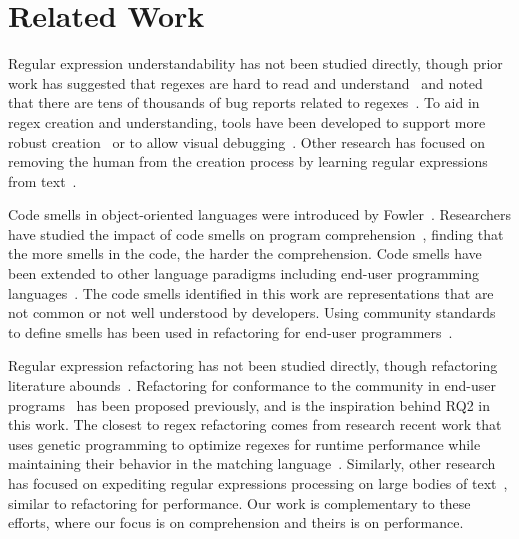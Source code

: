 \section{Related Work}
\label{sec:related}
Regular expression understandability has not been studied directly, though prior work has suggested that regexes are hard to read and understand~\cite{chapman2016} and noted that there are tens of thousands of bug reports related to regexes~\cite{Spishak:2012:TSR:2318202.2318207}. 
To aid in regex creation and understanding,  tools have been developed to support more robust creation~\cite{Spishak:2012:TSR:2318202.2318207} or to allow visual debugging~\cite{Beck:2014:RVD:2591062.2591111}. Other research has focused on removing the human from the creation process by learning regular expressions from  text~\cite{Babbar:2010:CBA:1871840.1871848, Li:2008:REL:1613715.1613719}.

Code smells in object-oriented languages were introduced by Fowler~\cite{Fowl1999}. Researchers have studied the impact of code smells on program comprehension~\cite{abbes2011empirical, du2006does}, finding that the more smells in the code, the harder the comprehension. 
Code smells have been extended to other language paradigms including end-user programming languages~\cite{Hermans2012intra, Hermans2012intraExt, stoleeicse, stoleeTSE}. The code smells identified in this work are representations that are not common or not well understood by developers. Using community standards to define smells has been used in refactoring   for end-user programmers~\cite{stoleeicse, stoleeTSE}. 

Regular expression refactoring has not been studied directly, though refactoring literature abounds~\cite{Mens:2004:SSR:972215.972286, opdyke1992refactoring, Griswold:1993:AAP:152388.152389}. 
Refactoring for conformance to the community in end-user programs~\cite{stoleeicse, stoleeTSE} has been proposed previously, and is the inspiration behind RQ2 in this work.
The closest to regex refactoring comes from research recent work that uses genetic programming to optimize regexes for runtime performance while maintaining their behavior in the matching language~\cite{cody2017search}. 
Similarly, other research has focused on expediting  regular expressions processing on large bodies of text~\cite{Baeza-Yates:1996:FTS:235809.235810},  similar to refactoring for performance. 
Our work is complementary to these efforts, where our focus is on comprehension and theirs is on performance. 

